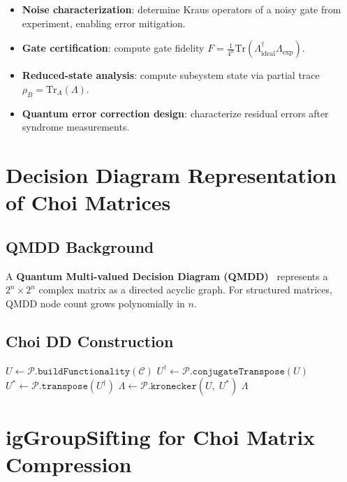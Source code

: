 \documentclass[11pt,a4paper]{article}
\begin{document}
\begin{itemize}
  \item \textbf{Noise characterization}: determine Kraus operators of a noisy
    gate from experiment, enabling error mitigation.
  \item \textbf{Gate certification}: compute gate fidelity
    $F = \frac{1}{4^n}\mathrm{Tr}(\Lambda_{\mathrm{ideal}}^\dagger \Lambda_{\mathrm{exp}})$.
  \item \textbf{Reduced-state analysis}: compute subsystem state via partial trace
    $\rho_B = \mathrm{Tr}_A(\Lambda)$.
  \item \textbf{Quantum error correction design}: characterize residual errors
    after syndrome measurements.
\end{itemize}

\section{Decision Diagram Representation of Choi Matrices}

\subsection{QMDD Background}

A \textbf{Quantum Multi-valued Decision Diagram (QMDD)}~\cite{miller2006qmdd}
represents a $2^n \times 2^n$ complex matrix as a directed acyclic graph.
For structured matrices, QMDD node count grows polynomially in $n$.

\subsection{Choi DD Construction}

\begin{algorithm}[h]
\caption{Build Choi Matrix DD}
\begin{algorithmic}[1]
  \State $U \gets \mathcal{P}.\texttt{buildFunctionality}(\mathcal{C})$
  \State $U^\dagger \gets \mathcal{P}.\texttt{conjugateTranspose}(U)$
  \State $U^* \gets \mathcal{P}.\texttt{transpose}(U^\dagger)$
  \State $\Lambda \gets \mathcal{P}.\texttt{kronecker}(U,\; U^*)$
  \State \Return $\Lambda$ 
\EndProcedure
\end{algorithmic}
\end{algorithm}

\section{igGroupSifting for Choi Matrix Compression}
\end{document}
